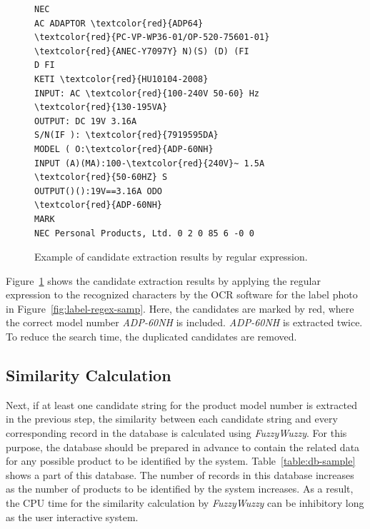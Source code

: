 \documentclass[technicalreport]{ieicej}
\begin{document}
            \begin{figure}[t] 
                \begin{center}
                    \begin{BVerbatim}[commandchars=\\\{\}]
NEC
AC ADAPTOR \textcolor{red}{ADP64}
\textcolor{red}{PC-VP-WP36-01/OP-520-75601-01}
\textcolor{red}{ANEC-Y7097Y} N)(S) (D) (FI
D FI
KETI \textcolor{red}{HU10104-2008}
INPUT: AC \textcolor{red}{100-240V 50-60} Hz \textcolor{red}{130-195VA}
OUTPUT: DC 19V 3.16A
S/N(IF ): \textcolor{red}{7919595DA}
MODEL ( O:\textcolor{red}{ADP-60NH}
INPUT (A)(MA):100-\textcolor{red}{240V}~ 1.5A \textcolor{red}{50-60HZ} S
OUTPUT()():19V==3.16A ODO
\textcolor{red}{ADP-60NH}
MARK
NEC Personal Products, Ltd. 0 2 0 85 6 -0 0
                \end{BVerbatim}
            \end{center}
            \caption{Example of candidate extraction results by regular expression.}
            \label{fig:result-regex}
        \end{figure}

        Figure~\ref{fig:result-regex} shows the candidate extraction results by applying the regular expression to the recognized characters by the OCR software for the label photo in Figure~\ref{fig:label-regex-samp}. Here, the candidates are marked by red, where the correct model number {\em ADP-60NH} is included. {\em ADP-60NH} is extracted twice. To reduce the search time, the duplicated candidates are removed.

        
    \subsection{Similarity Calculation}
    \label{sec:algorithm.ocrregex}
        Next, if at least one candidate string for the product model number is extracted in the previous step, the similarity between each candidate string and every corresponding record in the database is calculated using {\em FuzzyWuzzy}. For this purpose, the database should be prepared in advance to contain the related data for any possible product to be identified by the system. Table~\ref{table:db-sample} shows a part of this database. The number of records in this database increases as the number of products to be identified by the system increases. As a result, the CPU time for the similarity calculation by {\em FuzzyWuzzy} can be inhibitory long as the user interactive system.
\end{document}

